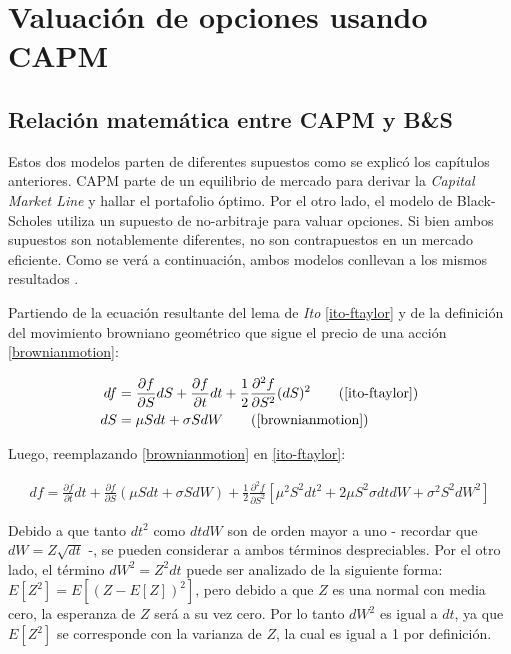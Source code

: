 
\chapter{Valuación de opciones usando CAPM}\label{ValuacionMedianteCAPM}

\section{Relación matemática entre CAPM y B\&S}

Estos dos modelos parten de diferentes supuestos como se explicó los capítulos anteriores. CAPM parte de un equilibrio de mercado para derivar la \textit{Capital Market Line} y hallar el portafolio óptimo. Por el otro lado, el modelo de Black-Scholes utiliza un supuesto de no-arbitraje para valuar opciones. Si bien ambos supuestos son notablemente diferentes, no son contrapuestos en un mercado eficiente. Como se verá a continuación, ambos modelos conllevan a los mismos resultados \cite{kishimoto}.

Partiendo de la ecuación resultante del lema de \textit{Ito} \eqref{ito-ftaylor} y de la definición del movimiento browniano geométrico que sigue el precio de una acción \eqref{brownianmotion}:

\begin{align}
	df &= \frac{\partial f}{\partial S} dS + 
		\frac{\partial f}{\partial t} dt + 
		\frac{1}{2} \frac{\partial^2 f}{\partial S^2} (dS)^2 \tag{\ref{ito-ftaylor}} \\
	dS &= \mu S dt + \sigma S dW \tag{\ref{brownianmotion}}
\end{align}

Luego, reemplazando \eqref{brownianmotion} en \eqref{ito-ftaylor}:

\begin{align}
	df = \frac{\partial f}{\partial t} dt +
		\frac{\partial f}{\partial S} (\mu S dt + \sigma S dW) +
		\frac{1}{2} \frac{\partial^2 f}{\partial S^2} \left[ \mu^2 S^2 dt^2 + 2 \mu S^2 \sigma dt dW + \sigma^2 S^2 dW^2 \right]
		\label{capmbs1}
\end{align}

Debido a que tanto $dt^2$ como $dt dW$ son de orden mayor a uno - recordar que $dW = Z \sqrt{dt}$ -, se pueden considerar a ambos términos despreciables. Por el otro lado, el término $dW^2 = Z^2 dt$ puede ser analizado de la siguiente forma: $E[Z^2] = E[(Z - E[Z])^2]$, pero debido a que $Z$ es una normal con media cero, la esperanza de $Z$ será a su vez cero. Por lo tanto $dW^2$ es igual a $dt$, ya que $E[Z^2]$ se corresponde con la varianza de $Z$, la cual es igual a 1 por definición.

